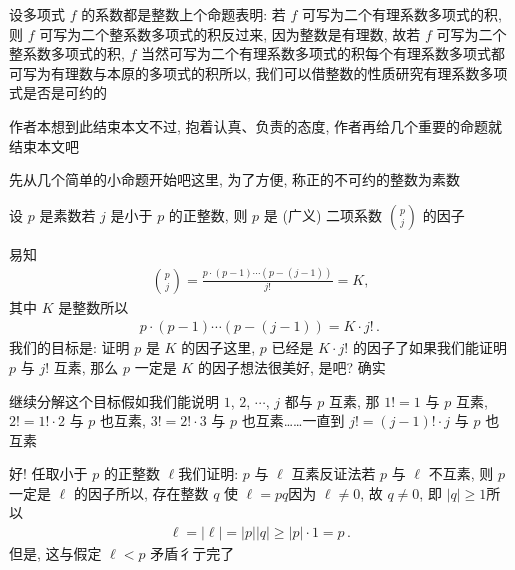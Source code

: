 \begin{remark}
    设多项式 $f$ 的系数都是整数\period 上个命题表明: 若 $f$ 可写为二个有理系数多项式的积, 则 $f$ 可写为二个整系数多项式的积\period 反过来, 因为整数是有理数, 故若 $f$ 可写为二个整系数多项式的积, $f$ 当然可写为二个有理系数多项式的积\period 每个有理系数多项式都可写为有理数与本原的多项式的积\period 所以, 我们可以借整数的性质研究有理系数多项式是否是可约的\period
\end{remark}

\myLine

作者本想到此结束本文\period 不过, 抱着认真、负责的态度, 作者再给几个重要的命题就结束本文吧\period

先从几个简单的小命题开始吧\period 这里, 为了方便, 称正的不可约的整数为素数\period

\begin{proposition}
    设 $p$ 是素数\period 若 $j$ 是小于 $p$ 的正整数, 则 $p$ 是 (广义) 二项系数 $\binom{p}{j}$ 的因子\period
\end{proposition}

\begin{pf}
    易知
    \begin{align*}
        \binom{p}{j} = \frac{p \cdot (p-1) \cdots (p-(j-1))}{j!} = K,
    \end{align*}
    其中 $K$ 是整数\period 所以
    \begin{align*}
        p \cdot (p-1) \cdots (p-(j-1)) = K \cdot j! \period
    \end{align*}
    我们的目标是: 证明 $p$ 是 $K$ 的因子\period 这里, $p$ 已经是 $K \cdot j!$ 的因子了\period 如果我们能证明 $p$ 与 $j!$ 互素, 那么 $p$ 一定是 $K$ 的因子\period 想法很美好, 是吧? 确实\period

    继续分解这个目标\period 假如我们能说明 $1$, $2$, $\cdots$, $j$ 都与 $p$ 互素, 那 $1! = 1$ 与 $p$ 互素, $2! = 1! \cdot 2$ 与 $p$ 也互素, $3! = 2! \cdot 3$ 与 $p$ 也互素……一直到 $j! = (j-1)! \cdot j$ 与 $p$ 也互素\period

    好! 任取小于 $p$ 的正整数 $\ell$\period 我们证明: $p$ 与 $\ell$ 互素\period 反证法\period 若 $p$ 与 $\ell$ 不互素, 则 $p$ 一定是 $\ell$ 的因子\period 所以, 存在整数 $q$ 使 $\ell = pq$\period 因为 $\ell \neq 0$, 故 $q \neq 0$, 即 $|q| \geq 1$\period 所以
    \begin{align*}
        \ell = |\ell| = |p| |q| \geq |p| \cdot 1 = p \period
    \end{align*}
    但是, 这与假定 $\ell < p$ 矛盾\period 彳亍\period 完了\period
\end{pf}

